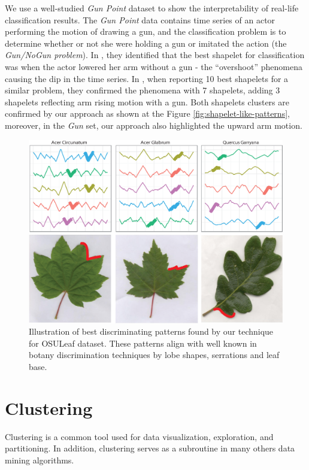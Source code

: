 \documentclass{llncs}
\begin{document}
We use a well-studied \textit{Gun Point} dataset to show the interpretability of real-life
classification results. The \textit{Gun Point} data contains time series of an actor performing the
motion of drawing a gun, and the classification problem is to determine whether or not she were
holding a gun or imitated the action (the \textit{Gun/NoGun problem}). In \cite{shapelet}, they
identified that the best shapelet for classification was when the actor lowered her arm without a
gun - the ``overshoot'' phenomena causing the dip in the time series. In \cite{bagnal}, when
reporting 10 best shapelets for a similar problem, they confirmed the phenomena with 7 shapelets,
adding 3 shapelets reflecting arm rising motion with a gun. Both shapelets clusters are confirmed by
our approach as shown at the Figure \ref{fig:shapelet-like-patterns}, moreover, in the \textit{Gun}
set, our approach also highlighted the upward arm motion.
\begin{figure}[tbp]
   \centering
   \includegraphics[width=130mm]{figures/AcerCircunatum.eps}
   \caption{Illustration of best discriminating patterns found by our technique for OSULeaf
dataset. These patterns align with well known in botany discrimination techniques by lobe
shapes, serrations and leaf base.}
   \label{fig:shapelet-acer-patterns}
\end{figure}

\section{Clustering}
Clustering is a common tool used for data visualization, exploration, and partitioning. 
In addition, clustering serves as a subroutine in many others data mining algorithms.
\end{document}
